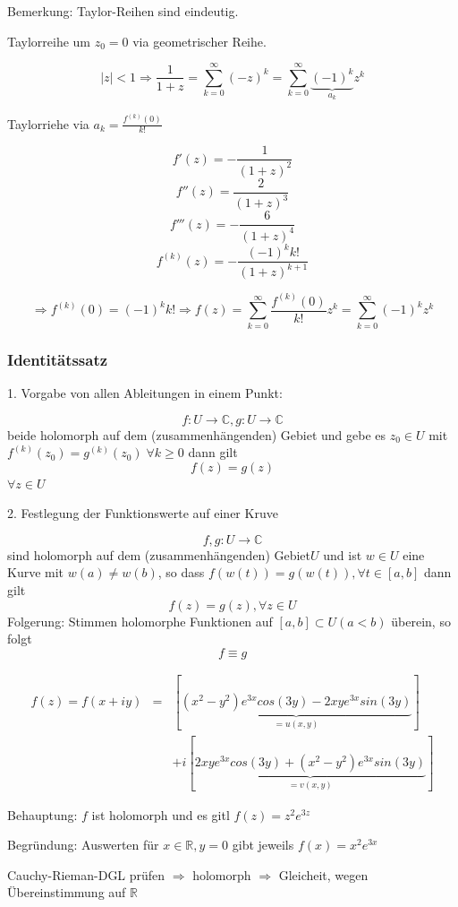 \documentclass[10pt,a4paper]{article}
\begin{document}
Bemerkung:
Taylor-Reihen sind eindeutig.

\begin{bsp}[Berechnung der Taylorreihe von $f(z)=\frac{1}{1+z}$ auf zwei Wegen]

Taylorreihe um $z_0=0$ via geometrischer Reihe.

$$|z| < 1 \Rightarrow \frac{1}{1+z}=\sum_{k=0}^{\infty} (-z)^{k} = \sum_{k=0}^{\infty} \underbrace{(-1)^{k}}_{a_k} z^{k}$$

Taylorriehe via $a_k=\frac{f^{(k)}(0)}{k!}$

$$f'(z)=-\frac{1}{(1+z)^{2}}$$
$$f''(z)=\frac{2}{(1+z)^{3}}$$
$$f'''(z)=-\frac{6}{(1+z)^{4}}$$
$$f^{(k)}(z)=-\frac{(-1)^{k} k!}{(1+z)^{k+1}}$$

$$\Rightarrow f^{(k)}(0) = (-1)^{k} k! \Rightarrow f(z)=\sum_{k=0}^{\infty} \frac{f^{(k)}(0)}{k!} z^{k} = \sum_{k=0}^{\infty} (-1)^{k} z^{k}$$
\end{bsp}


\subsubsection{Identitätssatz}


1. Vorgabe von allen Ableitungen in einem Punkt:


\begin{satz}
$$f:U \rightarrow \mathbb{C}, g:U \rightarrow \mathbb{C}$$
beide holomorph auf dem (zusammenhängenden) Gebiet und gebe es $z_0 \in U$ mit $f^{(k)}(z_0) = g^{(k)}(z_0) \; \forall k \geq 0$ dann gilt $$f(z)=g(z)$$ $\forall z \in U$ 
\end{satz}


2. Festlegung der Funktionswerte auf einer Kruve


\begin{satz}
$$f,g: U \rightarrow \mathbb{C}$$ sind holomorph auf dem (zusammenhängenden) Gebiet$U$ und ist $w \in U$ eine Kurve mit $w(a) \not= w(b)$, so dass $f(w(t))=g(w(t)), \forall t \in [a,b]$ dann gilt
$$f(z)=g(z), \forall z \in U$$
Folgerung: Stimmen holomorphe Funktionen auf $[a,b] \subset U (a < b)$ überein, so folgt $$f \equiv g$$
\end{satz}


\begin{bsp}


\begin{eqnarray*}
f(z)= f(x+iy) &=& [\underbrace{(x^{2}-y^{2})e^{3x}cos(3y)-2xye^{3x}sin(3y)}_{=u(x,y)}] \\
& & +i [\underbrace{2xye^{3x}cos(3y)+(x^{2}-y^{2})e^{3x}sin(3y)}_{=v(x,y)}]
\end{eqnarray*}


Behauptung: $f$ ist holomorph und es gitl $f(z)=z^{2}e^{3z}$


Begründung: Auswerten für $x \in  \mathbb{R}, y=0$ gibt jeweils $f(x)=x^{2}e^{3x}$



 Cauchy-Rieman-DGL prüfen $\Rightarrow$ holomorph $\Rightarrow$ Gleicheit, wegen Übereinstimmung auf $\mathbb{R}$

\end{bsp}
\end{document}
